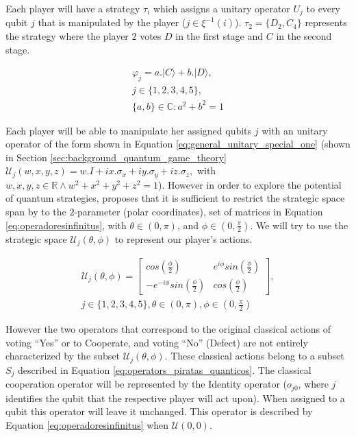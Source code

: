 \documentclass[10pt,twocolumn]{llncs}
\begin{document}
Each player will have a strategy $\tau_{i}$  which assigns a
unitary operator $U_{j}$ to every qubit $j$ that is manipulated
by the player ($j$$\in\xi^{-1}(i)$). $\tau_{2}= \{D_{2},C_{4}\}$ represents the strategy where the player $2$ votes $D$ in the first stage and $C$ in the second stage.

\begin{equation}
\begin{split}
\varphi_{j} = a . \vert C \rangle + b . \vert D \rangle , \\  j \in \{ 1, 2, 3, 4, 5 \}, \\ \{ a,b \} \in \mathbb{C} : a^2 + b^2 =1
\end{split}
\label{eq:opvarphiquantumstates}
\end{equation}

Each player will be able to manipulate her assigned qubits $j$ with an unitary operator of the form shown in Equation \ref{eq:general_unitary_special_one} (shown in Section \ref{sec:background_quantum_game_theory} $\mathcal{U}_{j}(w,x,y,z)=w.I + ix.\sigma_{x} + iy.\sigma_{y} + iz.\sigma_{z}, $ with $ w,x,y,z \in \mathbb{R} \wedge  
w^2 + x^2 + y^2 + z^2 =1 $). However in  order to explore the potential of quantum strategies, \cite{Eisert2008} proposes that it is sufficient to restrict the strategic space span by to the $2$-parameter (polar coordinates), set of matrices in Equation \ref{eq:operadoresinfinitus}, with $ \theta \in ( 0, \pi )$, and $\phi \in ( 0, \frac{\pi}{2})$. We will try to use the strategic space $\mathcal{U}_{j}(\theta,\phi)$ to represent our player's actions.



\begin{equation}
\begin{split}
\mathcal{U}_{j}(\theta,\phi) = \left[\begin{array}{cc}
cos(\frac{\phi}{2}) & e^{i\phi}sin(\frac{\phi}{2})\\
-e^{-i\phi}sin(\frac{\phi}{2}) & cos(\frac{\phi}{2})
\end{array}\right] , \\  j \in \{ 1, 2, 3, 4, 5 \}, \theta \in ( 0, \pi ) , \phi \in ( 0, \frac{\pi}{2})
\end{split}
\label{eq:operadoresinfinitus}
\end{equation}


 However the two operators that correspond to the original classical actions of voting ``Yes'' or to Cooperate, and voting ``No'' (Defect) are not entirely characterized by the subset $\mathcal{U}_{j}(\theta, \phi)$. These classical actions belong to a subset $S_{j}$ described in Equation \ref{eq:operators_piratas_quanticos}.  
The classical cooperation operator will be represented by the Identity operator ($o_{j0}$, where $j$ identifies the qubit that the respective player will act upon). When assigned to a qubit this operator will leave it unchanged. This operator is described by Equation \ref{eq:operadoresinfinitus} when $\mathcal{U}(0,0)$.
\end{document}
